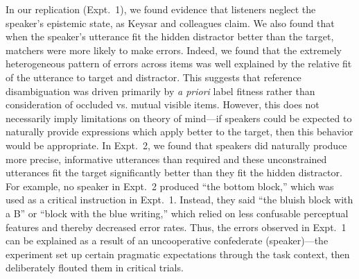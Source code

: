 \documentclass[manuscript]{stjour}
\begin{document}
In our replication (Expt.~1), we found evidence that listeners neglect the speaker's epistemic state, as Keysar and colleagues claim.
We also found that when the speaker's utterance fit the hidden distractor better than the target, matchers were more likely to make errors. 
Indeed, we found that the extremely heterogeneous pattern of errors across items was well explained by the relative fit of the utterance to target and distractor.
This suggests that reference disambiguation was driven primarily by \emph{a priori} label fitness rather than consideration of occluded vs. mutual visible items. 
%
However, this does not necessarily imply limitations on theory of mind---if speakers could be expected to naturally provide expressions which apply better to the target, then this behavior would be appropriate.
In Expt.~2, we found that speakers did naturally produce more precise, informative utterances than required and these unconstrained utterances fit the target significantly better than they fit the hidden distractor. 
For example, no speaker in Expt.~2 produced ``the bottom block,'' which was used as a critical instruction in Expt.~1. Instead, they said ``the bluish block with a B'' or ``block with the blue writing,'' which relied on less confusable perceptual features and thereby decreased error rates. 
Thus, the errors observed in Expt.~1 can be explained as a result of an uncooperative confederate (speaker)---the experiment set up certain pragmatic expectations through the task context, then deliberately flouted them in critical trials. 
\end{document}
